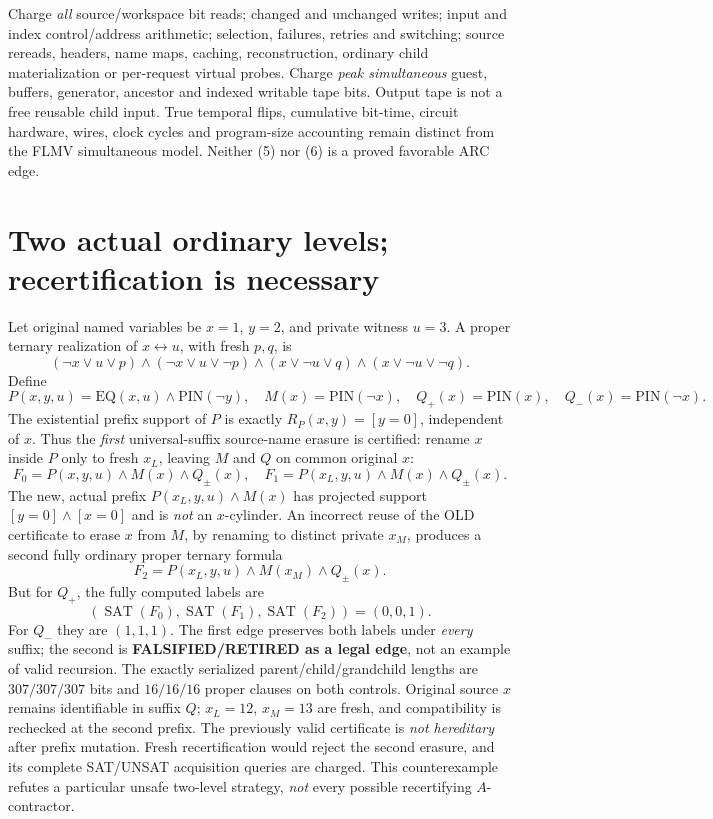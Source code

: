 \documentclass[11pt]{article}
\newcommand{\SAT}{\operatorname{SAT}}
\begin{document}
Charge \emph{all} source/workspace bit reads; changed and
unchanged writes; input and index control/address arithmetic;
selection, failures, retries and switching; source rereads,
headers, name maps, caching, reconstruction, ordinary child
materialization or per-request virtual probes. Charge \emph{peak
simultaneous} guest, buffers, generator, ancestor and indexed
writable tape bits. Output tape is not a free reusable child input.
True temporal flips, cumulative bit-time, circuit hardware,
wires, clock cycles and program-size accounting remain
distinct from the FLMV simultaneous model. Neither (5)
nor (6) is a proved favorable ARC edge.

\section{Two actual ordinary levels; recertification is necessary}
Let original named variables be $x=1$, $y=2$, and
private witness $u=3$. A proper ternary realization of
$x\leftrightarrow u$, with fresh $p,q$, is
\[
(\neg x\vee u\vee p)\wedge(\neg x\vee u\vee\neg p)
\wedge(x\vee\neg u\vee q)\wedge(x\vee\neg u\vee\neg q).
\]
Define
\[
P(x,y,u)=\mathrm{EQ}(x,u)\wedge\mathrm{PIN}(\neg y),
\quad M(x)=\mathrm{PIN}(\neg x),\quad
Q_+(x)=\mathrm{PIN}(x),\quad
Q_-(x)=\mathrm{PIN}(\neg x).
\]
The existential prefix support of $P$ is exactly
$R_P(x,y)=[y=0]$, independent of $x$.
Thus the \emph{first} universal-suffix source-name erasure is
certified: rename $x$ inside $P$ only to fresh $x_L$,
leaving $M$ and $Q$ on common original $x$:
\[
F_0=P(x,y,u)\wedge M(x)\wedge Q_\pm(x),\quad
F_1=P(x_L,y,u)\wedge M(x)\wedge Q_\pm(x).          \tag{7}
\]
The new, actual prefix $P(x_L,y,u)\wedge M(x)$ has
projected support $[y=0]\wedge[x=0]$ and is \emph{not}
an $x$-cylinder. An incorrect reuse of the OLD certificate
to erase $x$ from $M$, by renaming to distinct private $x_M$,
produces a second fully ordinary proper ternary formula
\[
F_2=P(x_L,y,u)\wedge M(x_M)\wedge Q_\pm(x).       \tag{8}
\]
But for $Q_+$, the fully computed labels are
\[
(\SAT(F_0),\SAT(F_1),\SAT(F_2))=(0,0,1).
\]
For $Q_-$ they are $(1,1,1)$.
The first edge preserves both labels under \emph{every} suffix;
the second is \textbf{FALSIFIED/RETIRED as a legal edge},
not an example of valid recursion. The exactly serialized
parent/child/grandchild lengths are $307/307/307$ bits
and $16/16/16$ proper clauses on both controls.
Original source $x$ remains identifiable in suffix $Q$;
$x_L=12$, $x_M=13$ are fresh, and compatibility is
rechecked at the second prefix. The previously valid
certificate is \emph{not hereditary} after prefix mutation.
Fresh recertification would reject the second erasure,
and its complete SAT/UNSAT acquisition queries are charged.
This counterexample refutes a particular unsafe two-level
strategy, \emph{not} every possible recertifying $A$-contractor.
\end{document}
